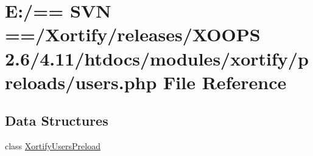\hypertarget{users_8php}{\section{E\-:/== S\-V\-N ==/\-Xortify/releases/\-X\-O\-O\-P\-S 2.6/4.11/htdocs/modules/xortify/preloads/users.php File Reference}
\label{users_8php}
}
\subsection*{Data Structures}
\begin{DoxyCompactItemize}
\item 
class \hyperlink{class_xortify_users_preload}{Xortify\-Users\-Preload}
\end{DoxyCompactItemize}
